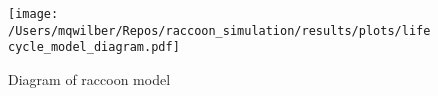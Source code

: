 \documentclass[11pt]{article}
\begin{document}
\clearpage

\begin{figure}
    \texttt{[image: /Users/mqwilber/Repos/raccoon\_simulation/results/plots/lifecycle\_model\_diagram.pdf]}
    \caption{Diagram of raccoon model}
    \label{fig:mod_diagram}
\end{figure}
\end{document}
